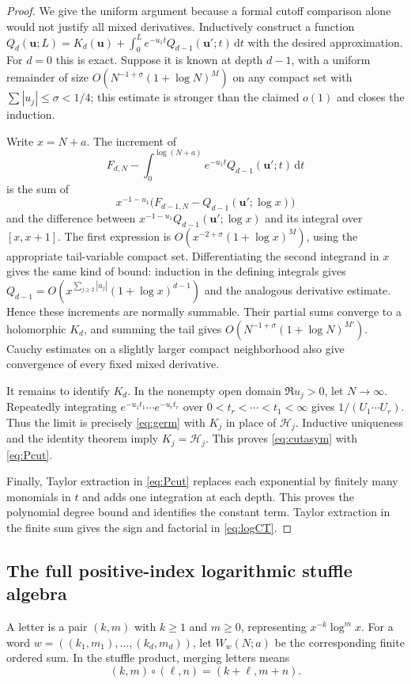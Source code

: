 \documentclass[11pt,a4paper]{article}
\numberwithin{equation}{section}
\theoremstyle{definition}\newtheorem{definition}[theorem]{Definition}
\theoremstyle{remark}\newtheorem{remark}[theorem]{Remark}
\newcommand{\HH}{\mathcal H}
\newcommand{\dd}{\,\mathrm d}
\begin{document}
\begin{proof}
We give the uniform argument because a formal cutoff comparison alone
would not justify all mixed derivatives. Inductively construct a function
$Q_d(\bm u;L)=K_d(\bm u)+\int_0^L e^{-u_1t}Q_{d-1}(\bm u';t)\dd t$
with the desired approximation. For $d=0$ this is exact. Suppose it is
known at depth $d-1$, with a uniform remainder of size
$O(N^{-1+\sigma}(1+\log N)^M)$ on any compact set with
$\sum|u_j|\le\sigma<1/4$; this estimate is stronger than the claimed
$o(1)$ and closes the induction.

Write $x=N+a$. The increment of
\[
 F_{d,N}-\int_0^{\log(N+a)}e^{-u_1t}Q_{d-1}(\bm u';t)\dd t
\]
is the sum of
\[
 x^{-1-u_1}\bigl(F_{d-1,N}-Q_{d-1}(\bm u';\log x)\bigr)
\]
and the difference between
$x^{-1-u_1}Q_{d-1}(\bm u';\log x)$ and its integral over $[x,x+1]$.
The first expression is $O(x^{-2+\sigma}(1+\log x)^M)$, using the
appropriate tail-variable compact set. Differentiating the second
integrand in $x$ gives the same kind of bound: induction in the defining
integrals gives
$Q_{d-1}=O(x^{\sum_{j\ge2}|u_j|}(1+\log x)^{d-1})$ and the analogous
derivative estimate. Hence these increments are normally summable.
Their partial sums converge to a holomorphic $K_d$, and summing the tail
gives $O(N^{-1+\sigma}(1+\log N)^{M'})$. Cauchy estimates on a slightly
larger compact neighborhood also give convergence of every fixed mixed
derivative.

It remains to identify $K_d$. In the nonempty open domain
$\Re u_j>0$, let $N\to\infty$. Repeatedly integrating
$e^{-u_1t_1}\cdots e^{-u_rt_r}$ over
$0<t_r<\cdots<t_1<\infty$ gives $1/(U_1\cdots U_r)$. Thus the limit
is precisely \eqref{eq:germ} with $K_j$ in place of $\HH_j$.
Inductive uniqueness and the identity theorem imply $K_j=\HH_j$.
This proves \eqref{eq:cutasym} with \eqref{eq:Pcut}.

Finally, Taylor extraction in \eqref{eq:Pcut} replaces each exponential
by finitely many monomials in $t$ and adds one integration at each depth.
This proves the polynomial degree bound and identifies the constant term.
Taylor extraction in the finite sum gives the sign and factorial in
\eqref{eq:logCT}.
\end{proof}

\subsection{The full positive-index logarithmic stuffle algebra}
A letter is a pair $(k,m)$ with $k\ge1$ and $m\ge0$, representing
$x^{-k}\log^m x$. For a word $w=((k_1,m_1),\ldots,(k_d,m_d))$, let
$W_w(N;a)$ be the corresponding finite ordered sum. In the stuffle product,
merging letters means
\begin{equation}\label{eq:merge}
 (k,m)\circ(\ell,n)=(k+\ell,m+n).
\end{equation}
\end{document}
